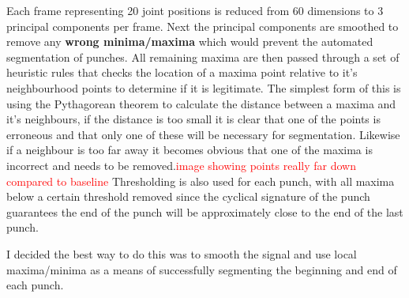 Each frame representing 20 joint positions is reduced from 60 dimensions to 3 principal components per frame. Next the principal components are smoothed to remove any {\bf wrong minima/maxima} which would prevent the automated segmentation of punches. All remaining maxima are then passed through a set of heuristic rules that checks the location of a maxima point relative to it's neighbourhood points to determine if it is legitimate. The simplest form of this is using the Pythagorean theorem to calculate the distance between a maxima and it's neighbours, if the distance is too small it is clear that one of the points is erroneous and that only one of these will be necessary for segmentation. Likewise if a neighbour is too far away it becomes obvious that one of the maxima is incorrect and needs to be removed.\textcolor{red}{image showing points really far down compared to baseline} Thresholding is also used for each punch, with all maxima below a certain threshold removed since the cyclical signature of the punch guarantees the end of the punch will be approximately close to the end of the last punch.

 I decided the best way to do this was to smooth the signal and use local maxima/minima as a means of successfully segmenting the beginning and end of each punch. 


